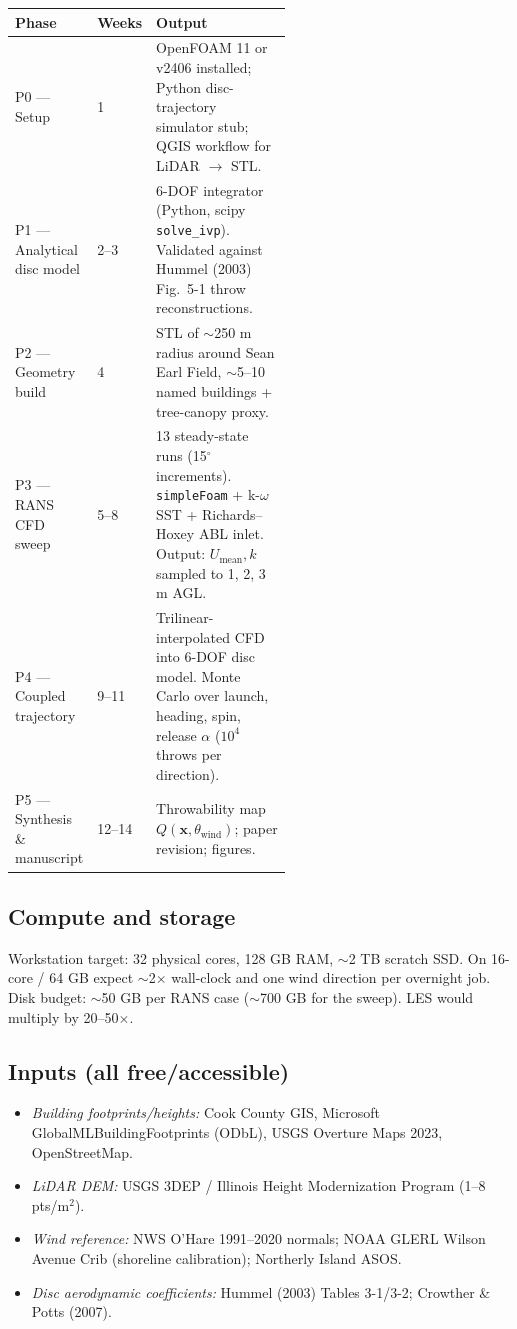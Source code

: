 \documentclass[11pt,letterpaper]{article}
\begin{document}
\begin{center}
\footnotesize
\begin{tabular}{@{}llp{0.55\linewidth}@{}}
\toprule
\textbf{Phase} & \textbf{Weeks} & \textbf{Output} \\
\midrule
P0 --- Setup & 1 & OpenFOAM 11 or v2406 installed; Python disc-trajectory simulator stub; QGIS workflow for LiDAR $\to$ STL. \\
P1 --- Analytical disc model & 2--3 & 6-DOF integrator (Python, scipy \texttt{solve\_ivp}). Validated against Hummel (2003) Fig.\ 5-1 throw reconstructions. \\
P2 --- Geometry build & 4 & STL of $\sim$250 m radius around Sean Earl Field, $\sim$5--10 named buildings + tree-canopy proxy. \\
P3 --- RANS CFD sweep & 5--8 & 13 steady-state runs (15$^\circ$ increments). \texttt{simpleFoam} + k-$\omega$ SST + Richards--Hoxey ABL inlet. Output: $U_{\text{mean}}, k$ sampled to 1, 2, 3 m AGL. \\
P4 --- Coupled trajectory & 9--11 & Trilinear-interpolated CFD into 6-DOF disc model. Monte Carlo over launch, heading, spin, release $\alpha$ ($10^4$ throws per direction). \\
P5 --- Synthesis \& manuscript & 12--14 & Throwability map $Q(\mathbf{x}, \theta_{\text{wind}})$; paper revision; figures. \\
\bottomrule
\end{tabular}
\end{center}

\subsection{Compute and storage}

Workstation target: 32 physical cores, 128 GB RAM, $\sim$2 TB scratch SSD. On 16-core / 64 GB expect $\sim$2$\times$ wall-clock and one wind direction per overnight job. Disk budget: $\sim$50 GB per RANS case ($\sim$700 GB for the sweep). LES would multiply by 20--50$\times$.

\subsection{Inputs (all free/accessible)}

\begin{itemize}[leftmargin=*,itemsep=2pt]
  \item \emph{Building footprints/heights:} Cook County GIS, Microsoft GlobalMLBuildingFootprints (ODbL), USGS Overture Maps 2023, OpenStreetMap.
  \item \emph{LiDAR DEM:} USGS 3DEP / Illinois Height Modernization Program (1--8 pts/m$^2$).
  \item \emph{Wind reference:} NWS O'Hare 1991--2020 normals; NOAA GLERL Wilson Avenue Crib (shoreline calibration); Northerly Island ASOS.
  \item \emph{Disc aerodynamic coefficients:} Hummel (2003) Tables 3-1/3-2; Crowther \& Potts (2007).
\end{itemize}
\end{document}
